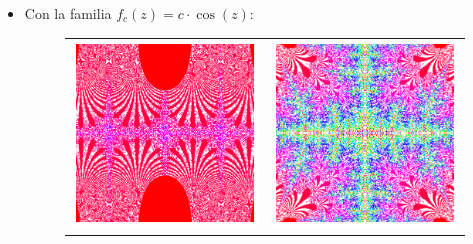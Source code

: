\begin{itemize}
\item Con la familia $f_c(z)=c\cdot \cos(z)$:
  
\begin{figure}[ht]
  \centering
  \begin{tabular}{cc}
    \includegraphics[scale=0.5]{./img/C3/juliaC-1.png} &   \includegraphics[scale=0.5]{./img/C3/juliaC-2.png}
  \end{tabular}
\end{figure}


\end{itemize}
